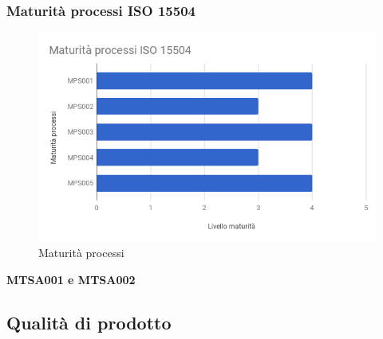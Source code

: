 \documentclass[PianoDiQualifica.tex]{subfiles}
\begin{document}
\subsubsection{Maturità processi ISO 15504}
\begin{figure}[H]
	\centering
	\includegraphics[width=0.7\linewidth]{RA/Processi}
	\caption{Maturità processi}
	\label{fig:processi}
\end{figure}

\textbf{MTSA001 e MTSA002}



\newpage
\subsection{Qualità di prodotto}
\end{document}
